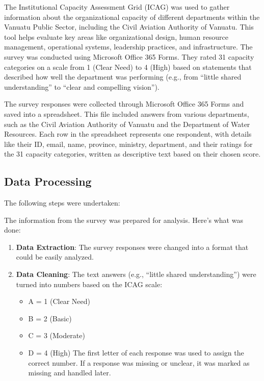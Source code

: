 \documentclass[
  10pt,
]{report}
\providecommand{\tightlist}{%
  \setlength{\itemsep}{0pt}\setlength{\parskip}{0pt}}
\begin{document}
The Institutional Capacity Assessment Grid (ICAG) was used to gather
information about the organizational capacity of different departments
within the Vanuatu Public Sector, including the Civil Aviation Authority
of Vanuatu. This tool helps evaluate key areas like organizational
design, human resource management, operational systems, leadership
practices, and infrastructure. The survey was conducted using Microsoft
Office 365 Forms. They rated 31 capacity categories on a scale from 1
(Clear Need) to 4 (High) based on statements that described how well the
department was performing (e.g., from ``little shared understanding'' to
``clear and compelling vision'').

The survey responses were collected through Microsoft Office 365 Forms
and saved into a spreadsheet. This file included answers from various
departments, such as the Civil Aviation Authority of Vanuatu and the
Department of Water Resources. Each row in the spreadsheet represents
one respondent, with details like their ID, email, name, province,
ministry, department, and their ratings for the 31 capacity categories,
written as descriptive text based on their chosen score.

\subsection{Data Processing}\label{data-processing}

The following steps were undertaken:

The information from the survey was prepared for analysis. Here's what
was done:

\begin{enumerate}
\def\labelenumi{\arabic{enumi}.}
\tightlist
\item
  \textbf{Data Extraction}: The survey responses were changed into a
  format that could be easily analyzed.
\item
  \textbf{Data Cleaning}: The text answers (e.g., ``little shared
  understanding'') were turned into numbers based on the ICAG scale:

  \begin{itemize}
  \tightlist
  \item
    A = 1 (Clear Need)
  \item
    B = 2 (Basic)
  \item
    C = 3 (Moderate)
  \item
    D = 4 (High) The first letter of each response was used to assign
    the correct number. If a response was missing or unclear, it was
    marked as missing and handled later.
  \end{itemize}
\end{enumerate}
\end{document}

